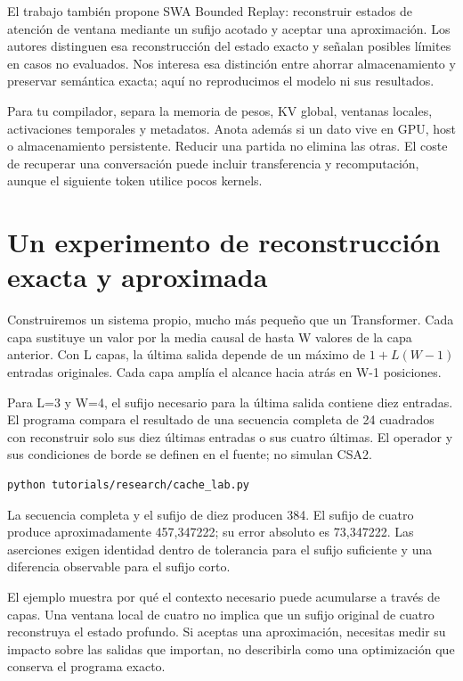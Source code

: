 \documentclass[12pt,a4paper,oneside]{report}
\begin{document}
El trabajo también propone SWA Bounded Replay: reconstruir estados de atención de ventana mediante un sufijo acotado y aceptar una aproximación. Los autores distinguen esa reconstrucción del estado exacto y señalan posibles límites en casos no evaluados. Nos interesa esa distinción entre ahorrar almacenamiento y preservar semántica exacta; aquí no reproducimos el modelo ni sus resultados. \cite{deepseek-v41}

Para tu compilador, separa la memoria de pesos, KV global, ventanas locales, activaciones temporales y metadatos. Anota además si un dato vive en GPU, host o almacenamiento persistente. Reducir una partida no elimina las otras. El coste de recuperar una conversación puede incluir transferencia y recomputación, aunque el siguiente token utilice pocos kernels.

\section{Un experimento de reconstrucción exacta y aproximada}
Construiremos un sistema propio, mucho más pequeño que un Transformer. Cada capa sustituye un valor por la media causal de hasta W valores de la capa anterior. Con L capas, la última salida depende de un máximo de $1+L(W-1)$ entradas originales. Cada capa amplía el alcance hacia atrás en W-1 posiciones.

Para L=3 y W=4, el sufijo necesario para la última salida contiene diez entradas. El programa compara el resultado de una secuencia completa de 24 cuadrados con reconstruir solo sus diez últimas entradas o sus cuatro últimas. El operador y sus condiciones de borde se definen en el fuente; no simulan CSA2.

\begin{lstlisting}[language=bash]
python tutorials/research/cache_lab.py
\end{lstlisting}
La secuencia completa y el sufijo de diez producen 384. El sufijo de cuatro produce aproximadamente 457,347222; su error absoluto es 73,347222. Las aserciones exigen identidad dentro de tolerancia para el sufijo suficiente y una diferencia observable para el sufijo corto.

El ejemplo muestra por qué el contexto necesario puede acumularse a través de capas. Una ventana local de cuatro no implica que un sufijo original de cuatro reconstruya el estado profundo. Si aceptas una aproximación, necesitas medir su impacto sobre las salidas que importan, no describirla como una optimización que conserva el programa exacto.
\end{document}
